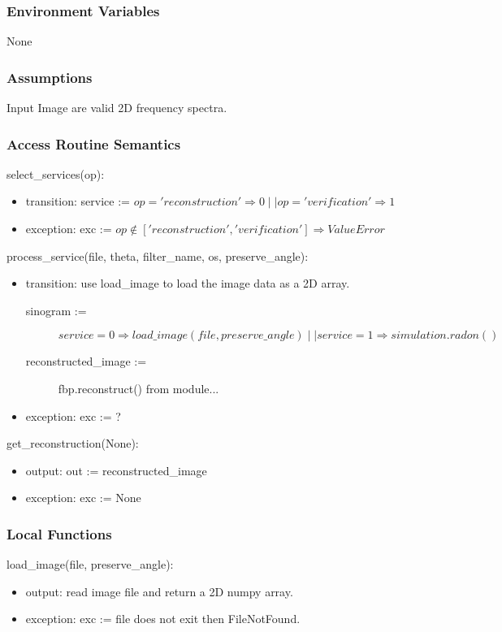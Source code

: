 \documentclass[12pt, titlepage]{article}
\begin{document}
\subsubsection{Environment Variables}
None

\subsubsection{Assumptions}
Input Image are valid 2D frequency spectra.

\subsubsection{Access Routine Semantics}

\noindent
select\_services(op):
\begin{itemize}
\item transition:  service := \(op ='reconstruction' \Rightarrow  0 \mid\mid op = 'verification' \Rightarrow  1\)
\item exception: exc := \(op \notin ['reconstruction', 'verification'] \Rightarrow ValueError\)
\end{itemize}

\noindent
process\_service(file, theta, filter\_name, os, preserve\_angle):
\begin{itemize}
\item transition:
  use load\_image to load the image data as a 2D array.
  \begin{description}
  \item[sinogram :=] \(service = 0 \Rightarrow load\_image(file, preserve\_angle) \mid\mid
    service = 1 \Rightarrow simulation.radon()\)
  \item[reconstructed\_image :=] fbp.reconstruct() from module...
  \end{description}
\item exception: exc := ?
\end{itemize}

\noindent
get\_reconstruction(None):
\begin{itemize}
\item output: out := reconstructed\_image
\item exception: exc := None
\end{itemize}
\subsubsection{Local Functions}
\noindent
load\_image(file, preserve\_angle):
\begin{itemize}
\item output: read image file and return a 2D numpy array.
\item exception: exc := file does not exit then FileNotFound.
\end{itemize}
\end{document}
